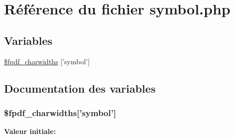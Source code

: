 \hypertarget{symbol_8php}{
\section{R\'{e}f\'{e}rence du fichier symbol.php}
\label{symbol_8php}
}
\subsection*{Variables}
\begin{CompactItemize}
\item 
\hyperlink{symbol_8php_a0}{\$fpdf\_\-charwidths} \mbox{[}'symbol'\mbox{]}
\end{CompactItemize}


\subsection{Documentation des variables}
\hypertarget{symbol_8php_a0}{
\subsubsection[\$fpdf\_\-charwidths]{\setlength{\rightskip}{0pt plus 5cm}\$fpdf\_\-charwidths\mbox{[}'symbol'\mbox{]}}}
\label{symbol_8php_a0}


{\bf Valeur initiale:}

